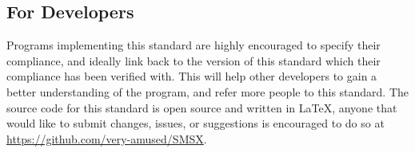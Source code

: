 \documentclass{article}
\begin{document}
\subsection{For Developers}
Programs implementing this standard are highly encouraged to specify their compliance, and ideally link back to the version of this standard which their compliance has been verified with. This will help other developers to gain a better understanding of the program, and refer more people to this standard. The source code for this standard is open source and written in \LaTeX{}, anyone that would like to submit changes, issues, or suggestions is encouraged to do so at \url{https://github.com/very-amused/SMSX}.
\end{document}
